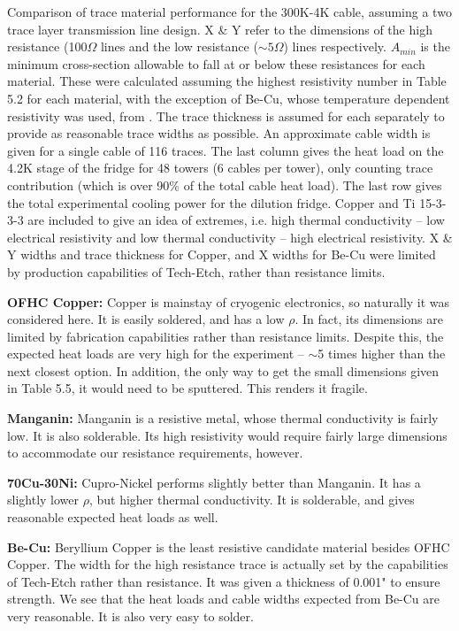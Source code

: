 \documentclass{report}
\begin{document}
\begin{table}[h]
\caption{Comparison of trace material performance for the 300K-4K cable, assuming a two trace layer transmission line design. X \& Y refer to the dimensions of the high resistance (100$\Omega$ lines and the low resistance ($\sim 5\Omega$) lines respectively. $A_{min}$ is the minimum cross-section allowable to fall at or below these resistances for each material. These were calculated assuming the highest resistivity number in Table 5.2 for each material, with the exception of Be-Cu, whose temperature dependent resistivity was used, from \cite{Sciver1986}. The trace thickness is assumed for each separately to provide as reasonable trace widths as possible. An approximate cable width is given for a single cable of 116 traces. The last column gives the  heat load on the 4.2K stage of the fridge for 48 towers (6 cables per tower), only counting trace contribution (which is over 90\% of the total cable heat load). The last row gives the total experimental cooling power for the dilution fridge. Copper and Ti 15-3-3-3 are included to give an idea of extremes, i.e. high thermal conductivity -- low electrical resistivity and low thermal conductivity -- high electrical resistivity. X \& Y widths and trace thickness for Copper, and X widths for Be-Cu were limited by production capabilities of Tech-Etch, rather than resistance limits.}
\end{table}

\textbf{OFHC Copper:} Copper is mainstay of cryogenic electronics, so naturally it was considered here. It is easily soldered, and has a low $\rho$. In fact, its dimensions are limited by fabrication capabilities rather than resistance limits. Despite this, the expected heat loads are very high for the experiment -- $\sim$5 times higher than the next closest option. In addition, the only way to get the small dimensions given in Table 5.5, it would need to be sputtered. This renders it fragile.

\textbf{Manganin:} Manganin is a resistive metal, whose thermal conductivity is fairly low. It is also solderable. Its high resistivity would require fairly large dimensions to accommodate our resistance requirements, however.

\textbf{70Cu-30Ni:} Cupro-Nickel performs slightly better than Manganin. It has a slightly lower $\rho$, but higher thermal conductivity. It is solderable, and gives reasonable expected heat loads as well.

\textbf{Be-Cu:} Beryllium Copper is the least resistive candidate material besides OFHC Copper. The width for the high resistance trace is actually set by the capabilities of Tech-Etch rather than resistance. It was given a thickness of 0.001" to ensure strength. We see that the heat loads and cable widths expected from Be-Cu are very reasonable. It is also very easy to solder.
\end{document}
